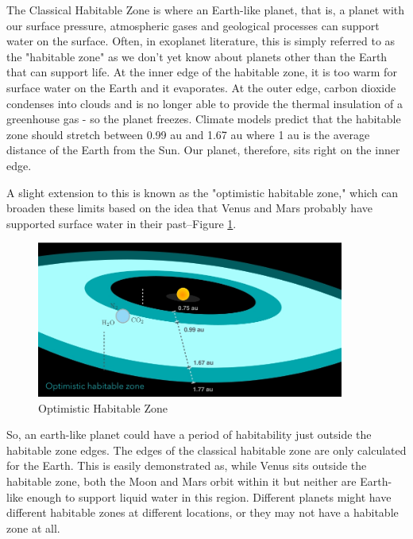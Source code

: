 \documentclass[]{article}
\begin{document}
The Classical Habitable Zone
is where an Earth-like planet,
that is, a planet with
our surface pressure,
atmospheric gases
and geological processes
can support water on the surface.
Often, in exoplanet literature,
this is simply referred to
as the "habitable zone"
as we don't yet know about planets
other than the Earth
that can support life.
At the inner edge of the habitable zone,
it is too warm for surface water
on the Earth and it evaporates.
At the outer edge, carbon dioxide
condenses into clouds
and is no longer able to provide
the thermal insulation
of a greenhouse gas -
so the planet freezes.
Climate models predict that
the habitable zone should stretch
between 0.99 au and 1.67 au
where 1 au is the average distance
of the Earth from the Sun.
Our planet, therefore,
sits right on the inner edge.

A slight extension to this is known as
the "optimistic habitable zone,"
which can broaden these limits
based on the idea
that Venus and Mars probably have
supported surface water in their past--Figure \ref{fig:optimistic:habitable:zone}.

\begin{figure}[H]
	\caption[Optimistic Habitable Zone]{Optimistic Habitable Zone\cite{kasting1993habitable,kopparapu2013habitable}}\label{fig:optimistic:habitable:zone}
	\includegraphics[width=0.9\textwidth]{OptimisticHabitableZone.jpg}
\end{figure}

So, an earth-like planet
could have a period of habitability
just outside the habitable zone edges.
The edges of the classical habitable zone
are only calculated for the Earth.
This is easily demonstrated as,
while Venus sits outside
the habitable zone,
both the Moon and Mars orbit within it
but neither are Earth-like enough
to support liquid water in this region.
Different planets might have different
habitable zones at different locations,
or they may not have
a habitable zone at all.
\end{document}
